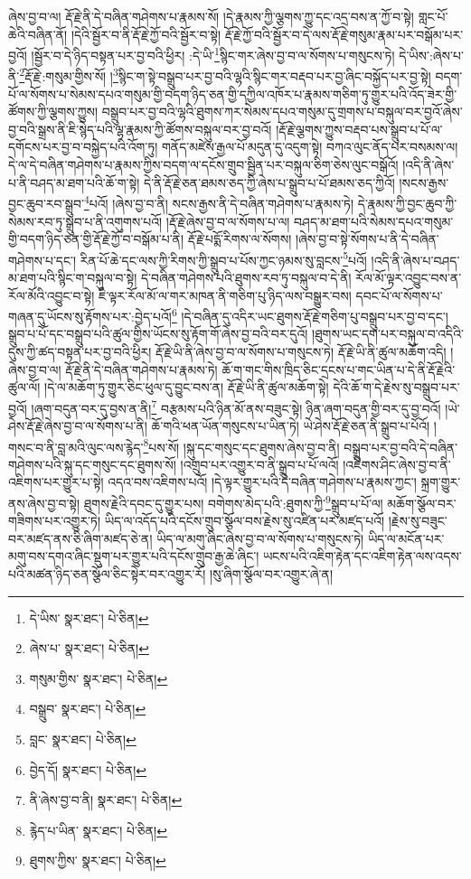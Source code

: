 ཞེས་བྱ་བ་ལ། རྡོ་རྗེ་ནི་དེ་བཞིན་གཤེགས་པ་རྣམས་སོ། །དེ་རྣམས་ཀྱི་ལྕགས་ཀྱུ་དང་འདྲ་བས་ན་ཀྱོ་བ་སྟེ། གླང་པོ་ཆེའི་བཞིན་ནོ། །དེའི་སྦྱོར་བ་ནི་རྡོ་རྗེ་ཀྱོ་བའི་སྦྱོར་བ་སྟེ། རྡོ་རྗེ་ཀྱོ་བའི་སྦྱོར་བ་དེ་ལས་རྡོ་རྗེ་གསུམ་རྣམ་པར་བསྒོམ་པར་བྱའོ། །སྦྱོར་བ་དེ་ཉིད་བསྟན་པར་བྱ་བའི་ཕྱིར། :དེ་ཡི་\footnote{དེ་ཡིས་  སྣར་ཐང་།  པེ་ཅིན། }སྙིང་གར་ཞེས་བྱ་བ་ལ་སོགས་པ་གསུངས་ཏེ། དེ་ཡིས་:ཞེས་པ་ནི་\footnote{ཞེས་པ་  སྣར་ཐང་།  པེ་ཅིན། }རྡོ་རྗེ་:གསུམ་གྱིས་སོ། །\footnote{གསུམ་གྱིས་  སྣར་ཐང་།  པེ་ཅིན། }སྙིང་ག་སྟེ་བསྒྲུབ་པར་བྱ་བའི་ལྷའི་སྙིང་གར་བརྡབ་པར་བྱ་ཞིང་བསྐྱོད་པར་བྱ་སྟེ། བདག་པོ་ལ་སོགས་པ་སེམས་དཔའ་གསུམ་གྱི་བདག་ཉིད་ཅན་གྱི་དཀྱིལ་འཁོར་པ་རྣམས་གཅིག་ཏུ་གྱུར་པའི་འོད་ཟེར་གྱི་ཚོགས་ཀྱི་ལྕགས་ཀྱུས། བསྒྲུབ་པར་བྱ་བའི་ལྷའི་ཐུགས་ཀར་སེམས་དཔའ་གསུམ་དུ་གྲགས་པ་བསྐུལ་བར་བྱའོ་ཞེས་བྱ་བའི་སྒྲས་ནི་ཇི་སྙེད་པའི་ལྷ་རྣམས་ཀྱི་ཚོགས་བསྐུལ་བར་བྱ་བའོ། །རྡོ་རྗེ་ལྕགས་ཀྱུས་བརྡབ་པས་སྒྲུབ་པ་པོ་ལ་དགོངས་པར་བྱ་བ་བསྐྱེད་པའི་འོག་ཏུ། གནོད་མཛེས་རྒྱལ་པོ་མདུན་དུ་འདུག་སྟེ། བཀའ་ལུང་ནོད་པར་བསམས་ལ། དེ་ལ་དེ་བཞིན་གཤེགས་པ་རྣམས་ཀྱིས་བདག་ལ་དངོས་གྲུབ་སྦྱིན་པར་བསྐུལ་ཅིག་ཅེས་ལུང་བསྒོའོ། །འདི་ནི་ཞེས་པ་ནི་བཤད་མ་ཐག་པའི་ཆོ་ག་སྟེ། དེ་ནི་རྡོ་རྗེ་ཅན་ཐམས་ཅད་ཀྱི་ཞེས་པ་སྒྲུབ་པ་པོ་ཐམས་ཅད་ཀྱིའོ། །སངས་རྒྱས་བྱང་ཆུབ་རབ་སྒྲུབ་\footnote{བསྒྲུབ་  སྣར་ཐང་།  པེ་ཅིན། }པའོ། །ཞེས་བྱ་བ་ནི། སངས་རྒྱས་ནི་དེ་བཞིན་གཤེགས་པ་རྣམས་ཏེ། དེ་རྣམས་ཀྱི་བྱང་ཆུབ་ཀྱི་སེམས་རབ་ཏུ་སྒྲུབ་པ་ནི་འགུགས་པའོ། །རྡོ་རྗེ་ཞེས་བྱ་བ་ལ་སོགས་པ་ལ། བཤད་མ་ཐག་པའི་སེམས་དཔའ་གསུམ་གྱི་བདག་ཉིད་ཅན་གྱི་རྡོ་རྗེ་ཀྱོ་བ་བསྒོམ་པ་ནི། རྡོ་རྗེ་པདྨོ་རིགས་ལ་སོགས། །ཞེས་བྱ་བ་སྟེ་སོགས་པ་ནི་དེ་བཞིན་གཤེགས་པ་དང་། རིན་པོ་ཆེ་དང་ལས་ཀྱི་རིགས་ཀྱི་སྒྲུབ་པ་པོས་ཀྱང་ཉམས་སུ་བླངས་\footnote{བླང་  སྣར་ཐང་།  པེ་ཅིན། }པའོ། །འདི་ནི་ཞེས་པ་བཤད་མ་ཐག་པའི་སྙིང་ག་བསྐུལ་བ་སྟེ། དེ་བཞིན་གཤེགས་པའི་ཐུགས་རབ་ཏུ་བསྐུལ་བ་དེ་ནི། རོལ་མོ་ལྟར་འབྱུང་བས་ན་རོལ་མོའི་འབྱུང་བ་སྟེ། ཇི་ལྟར་རོལ་མོ་ལ་གར་མཁན་ནི་གཅིག་པུ་ཉིད་ལས་བསྒྱུར་བས། དབང་པོ་ལ་སོགས་པ་གཞན་དུ་ཡོངས་སུ་རྟོགས་པར་:བྱེད་པའོ།\footnote{བྱེད་དོ།  སྣར་ཐང་།  པེ་ཅིན། } །དེ་བཞིན་དུ་འདིར་ཡང་ཐུགས་རྡོ་རྗེ་གཅིག་པུ་བསྒྲུབ་པར་བྱ་བ་དང་། སྒྲུབ་པ་པོ་དང་བསྒྲུབ་པའི་ཚུལ་གྱིས་ཡོངས་སུ་རྟོག་གོ་ཞེས་བྱ་བའི་བར་དུའོ། །ཐུགས་ཡང་དག་པར་བསྐུལ་བ་འདིའི་དུས་ཀྱི་ཚད་བསྟན་པར་བྱ་བའི་ཕྱིར། རྡོ་རྗེ་ཡི་ནི་ཞེས་བྱ་བ་ལ་སོགས་པ་གསུངས་ཏེ། རྡོ་རྗེ་ཡི་ནི་ཚུལ་མཆོག་འདི། །ཞེས་བྱ་བ་ལ། རྡོ་རྗེ་ནི་དེ་བཞིན་གཤེགས་པ་རྣམས་ཏེ། ཆོ་ག་གང་གིས་ཁྲིད་ཅིང་དྲངས་པ་གང་ཡིན་པ་དེ་ནི་རྡོ་རྗེའི་ཚུལ་ལོ། །དེ་ལ་མཆོག་ཏུ་གྱུར་ཅིང་ཕུལ་དུ་བྱུང་བས་ན། རྡོ་རྗེ་ཡི་ནི་ཚུལ་མཆོག་སྟེ། དེའི་ཆོ་ག་དེ་རྗེས་སུ་བསྒྲུབ་པར་བྱའོ། །ཞག་བདུན་བར་དུ་བྱས་ན་ནི།\footnote{ནི་ཞེས་བྱ་བ་ནི།  སྣར་ཐང་།  པེ་ཅིན། } བརྩམས་པའི་ཉིན་མོ་ནས་བཟུང་སྟེ། ཉིན་ཞག་བདུན་གྱི་བར་དུ་བྱ་བའོ། །ཡེ་ཤེས་རྡོ་རྗེ་ཞེས་བྱ་བ་ལ་སོགས་པ་ནི། ཆོ་གའི་ཕན་ཡོན་གསུངས་པ་ཡིན་ཏེ། ཡེ་ཤེས་རྡོ་རྗེ་ཅན་ནི་སྒྲུབ་པ་པོའོ། །གསང་བ་ནི་བླ་མའི་ལུང་ལས་རྙེད་\footnote{རྙེད་པ་ཡིན་  སྣར་ཐང་།  པེ་ཅིན། }པས་སོ། །སྐུ་དང་གསུང་དང་ཐུགས་ཞེས་བྱ་བ་ནི། བསྒྲུབ་པར་བྱ་བའི་དེ་བཞིན་གཤེགས་པའི་སྐུ་དང་གསུང་དང་ཐུགས་སོ། །འགྲུབ་པར་འགྱུར་བ་ནི་སྒྲུབ་པ་པོ་ལའོ། །འཇིགས་ཤིང་ཞེས་བྱ་བ་ནི་འཇིགས་པར་གྱུར་པ་སྟེ། འདའ་བས་འཇིགས་པའོ། །དེ་ལྟར་གྱུར་པའི་དེ་བཞིན་གཤེགས་པ་རྣམས་ཀྱང་། སྐྲག་གྱུར་ནས་ཞེས་བྱ་བ་སྟེ། ཐུགས་རྗེའི་དབང་དུ་གྱུར་པས། བགེགས་མེད་པའི་:ཐུགས་ཀྱི་\footnote{ཐུགས་ཀྱིས་  སྣར་ཐང་།  པེ་ཅིན། }སྒྲུབ་པ་པོ་ལ། མཆོག་སྩོལ་བར་གཟིགས་པར་འགྱུར་ཏེ། ཡིད་ལ་འདོད་པའི་དངོས་གྲུབ་སྩོལ་བས་རྗེས་སུ་འཛིན་པར་མཛད་པའོ། །རྗེས་སུ་བཟུང་བར་མཛད་ནས་ཅི་ཞིག་མཛད་ཅེ་ན། ཡིད་ལ་མགུ་ཞིང་ཞེས་བྱ་བ་ལ་སོགས་པ་གསུངས་ཏེ། ཡིད་ལ་མངོན་པར་མགུ་བས་དགའ་ཞིང་སྡུག་པར་གྱུར་པའི་དངོས་གྲུབ་རྒྱ་ཆེ་ཞིང་། ཡངས་པའི་འཇིག་རྟེན་དང་འཇིག་རྟེན་ལས་འདས་པའི་མཚན་ཉིད་ཅན་སྩོལ་ཅིང་སྟེར་བར་འགྱུར་རོ། །སུ་ཞིག་སྩོལ་བར་འགྱུར་ཞེ་ན། 